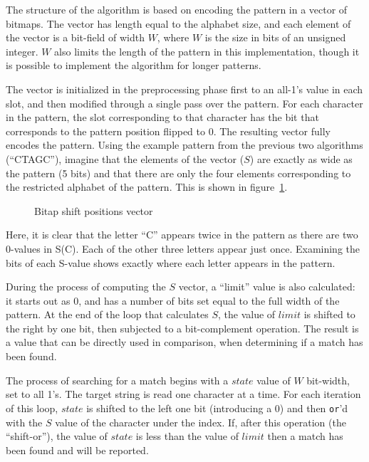 The structure of the algorithm is based on encoding the pattern in a vector of bitmaps. The vector has length equal to the alphabet size, and each element of the vector is a bit-field of width $W$, where $W$ is the size in bits of an unsigned integer. $W$ also limits the length of the pattern in this implementation, though it is possible to implement the algorithm for longer patterns.

The vector is initialized in the preprocessing phase first to an all-1's value in each slot, and then modified through a single pass over the pattern. For each character in the pattern, the slot corresponding to that character has the bit that corresponds to the pattern position flipped to 0. The resulting vector fully encodes the pattern. Using the example pattern from the previous two algorithms (``CTAGC''), imagine that the elements of the vector ($S$) are exactly as wide as the pattern (5 bits) and that there are only the four elements corresponding to the restricted alphabet of the pattern. This is shown in figure~\ref{fig:bitap_s_positions}.

\begin{figure}[ht]
\centering

\caption{Bitap shift positions vector}
\label{fig:bitap_s_positions}
\end{figure}

Here, it is clear that the letter ``C'' appears twice in the pattern as there are two 0-values in S(C). Each of the other three letters appear just once. Examining the bits of each S-value shows exactly where each letter appears in the pattern.

During the process of computing the $S$ vector, a ``limit'' value is also calculated: it starts out as 0, and has a number of bits set equal to the full width of the pattern. At the end of the loop that calculates $S$, the value of $limit$ is shifted to the right by one bit, then subjected to a bit-complement operation. The result is a value that can be directly used in comparison, when determining if a match has been found.

The process of searching for a match begins with a $state$ value of $W$ bit-width, set to all 1's. The target string is read one character at a time. For each iteration of this loop, $state$ is shifted to the left one bit (introducing a 0) and then \texttt{or}'d with the $S$ value of the character under the index. If, after this operation (the ``shift-or''), the value of $state$ is less than the value of $limit$ then a match has been found and will be reported.

